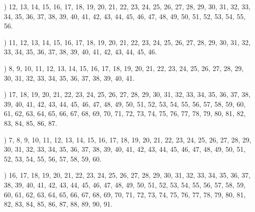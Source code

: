 \documentclass[a4paper,11pt]{article}
\begin{document}
\vspace{\spaceFour}



\noindent
{}) 12, 13, 14, 15, 16, 17, 18, 19, 20, 21, 22, 23, 24,
25, 26, 27, 28, 29, 30, 31, 32, 33, 34, 35, 36, 37, 38, 39, 40, 41,
42, 43, 44, 45, 46, 47, 48, 49, 50, 51, 52, 53, 54, 55, 56.

\vspace{\spaceFour}



\noindent
{}) 11, 12, 13, 14, 15, 16, 17, 18, 19, 20, 21, 22, 23,
24, 25, 26, 27, 28, 29, 30, 31, 32, 33, 34, 35, 36, 37, 38, 39, 40,
41, 42, 43, 44, 45, 46.

\vspace{\spaceFour}



\noindent
{}) 8, 9, 10, 11, 12, 13, 14, 15, 16, 17, 18, 19, 20, 21,
22, 23, 24, 25, 26, 27, 28, 29, 30, 31, 32, 33, 34, 35, 36, 37, 38,
39, 40, 41.

\vspace{\spaceFour}



\noindent
{}) 17, 18, 19, 20, 21, 22, 23, 24, 25, 26, 27, 28, 29,
30, 31, 32, 33, 34, 35, 36, 37, 38, 39, 40, 41, 42, 43, 44, 45, 46,
47, 48, 49, 50, 51, 52, 53, 54, 55, 56, 57, 58, 59, 60, 61, 62, 63,
64, 65, 66, 67, 68, 69, 70, 71, 72, 73, 74, 75, 76, 77, 78, 79, 80,
81, 82, 83, 84, 85, 86, 87.

\vspace{\spaceFour}



\noindent
{}) 7, 8, 9, 10, 11, 12, 13, 14, 15, 16, 17, 18, 19, 20,
21, 22, 23, 24, 25, 26, 27, 28, 29, 30, 31, 32, 33, 34, 35, 36, 37,
38, 39, 40, 41, 42, 43, 44, 45, 46, 47, 48, 49, 50, 51, 52, 53, 54,
55, 56, 57, 58, 59, 60.

\vspace{\spaceFour}



\noindent
{}) 16, 17, 18, 19, 20, 21, 22, 23, 24, 25, 26, 27, 28,
29, 30, 31, 32, 33, 34, 35, 36, 37, 38, 39, 40, 41, 42, 43, 44, 45,
46, 47, 48, 49, 50, 51, 52, 53, 54, 55, 56, 57, 58, 59, 60, 61, 62,
63, 64, 65, 66, 67, 68, 69, 70, 71, 72, 73, 74, 75, 76, 77, 78, 79,
80, 81, 82, 83, 84, 85, 86, 87, 88, 89, 90, 91.

\vspace{\spaceFour}
\end{document}
